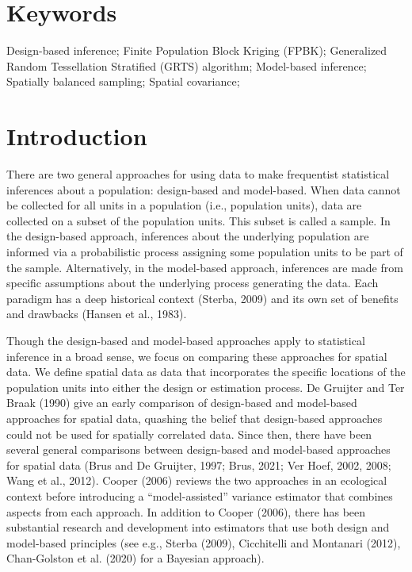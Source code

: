 \documentclass[]{elsarticle} %
\begin{document}
\hypertarget{keywords}{%
\section*{Keywords}\label{keywords}}

Design-based inference; Finite Population Block Kriging (FPBK);
Generalized Random Tessellation Stratified (GRTS) algorithm; Model-based
inference; Spatially balanced sampling; Spatial covariance;

\hypertarget{sec:introduction}{%
\section{Introduction}\label{sec:introduction}}

There are two general approaches for using data to make frequentist
statistical inferences about a population: design-based and model-based.
When data cannot be collected for all units in a population (i.e.,
population units), data are collected on a subset of the population
units. This subset is called a sample. In the design-based approach,
inferences about the underlying population are informed via a
probabilistic process assigning some population units to be part of the
sample. Alternatively, in the model-based approach, inferences are made
from specific assumptions about the underlying process generating the
data. Each paradigm has a deep historical context (Sterba, 2009) and its
own set of benefits and drawbacks (Hansen et al., 1983).

Though the design-based and model-based approaches apply to statistical
inference in a broad sense, we focus on comparing these approaches for
spatial data. We define spatial data as data that incorporates the
specific locations of the population units into either the design or
estimation process. De Gruijter and Ter Braak (1990) give an early
comparison of design-based and model-based approaches for spatial data,
quashing the belief that design-based approaches could not be used for
spatially correlated data. Since then, there have been several general
comparisons between design-based and model-based approaches for spatial
data (Brus and De Gruijter, 1997; Brus, 2021; Ver Hoef, 2002, 2008; Wang
et al., 2012). Cooper (2006) reviews the two approaches in an ecological
context before introducing a ``model-assisted'' variance estimator that
combines aspects from each approach. In addition to Cooper (2006), there
has been substantial research and development into estimators that use
both design and model-based principles (see e.g., Sterba (2009),
Cicchitelli and Montanari (2012), Chan-Golston et al. (2020) for a
Bayesian approach).
\end{document}

